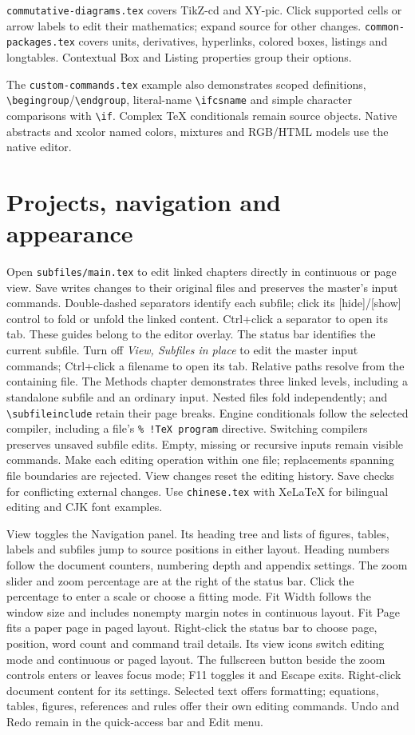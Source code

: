 \documentclass[11pt]{article}
\begin{document}
\texttt{commutative-diagrams.tex} covers TikZ-cd and XY-pic. Click supported cells
or arrow labels to edit their mathematics; expand source for other changes.
\texttt{common-packages.tex} covers units, derivatives, hyperlinks, colored boxes,
listings and longtables. Contextual Box and Listing properties group their options.

The \texttt{custom-commands.tex} example also demonstrates scoped definitions,
\verb|\begingroup|/\verb|\endgroup|, literal-name \verb|\ifcsname| and simple
character comparisons with \verb|\if|. Complex TeX conditionals remain source
objects. Native abstracts and xcolor named colors, mixtures and RGB/HTML models
use the native editor.

\section{Projects, navigation and appearance}
Open \texttt{subfiles/main.tex} to edit linked chapters directly in continuous
or page view. Save writes changes to their original files and preserves the
master's input commands. Double-dashed separators identify each subfile;
click its [hide]/[show] control to fold or unfold the linked content. Ctrl+click a separator to open its tab. These guides belong to the editor overlay. The status bar identifies the current subfile.
Turn off \emph{View, Subfiles in place} to edit the master input commands;
Ctrl+click a filename to open its tab. Relative paths resolve from the containing
file. The Methods chapter demonstrates three linked levels, including a
standalone subfile and an ordinary input. Nested files fold independently;
\verb|| and \verb|\subfileinclude| retain their page breaks.
Engine conditionals follow the selected compiler, including a file's
\verb|% !TeX program| directive. Switching compilers preserves unsaved subfile edits.
Empty, missing or recursive inputs remain visible commands. Make each editing operation within
one file; replacements spanning file boundaries are rejected. View changes
reset the editing history. Save checks for conflicting external changes.
Use \texttt{chinese.tex} with XeLaTeX for bilingual editing and CJK font examples.

View toggles the Navigation panel. Its heading tree and lists of figures,
tables, labels and subfiles jump to source positions in either layout. Heading
numbers follow the document counters, numbering depth and appendix settings. The zoom slider and
zoom percentage are at the right of the status bar. Click the percentage
to enter a scale or choose a fitting mode. Fit Width follows the
window size and includes nonempty margin notes in continuous layout. Fit Page
fits a paper page in paged layout. Right-click the status bar to choose page, position, word count and command
trail details. Its view icons switch editing mode and continuous or paged layout.
The fullscreen button beside the zoom controls enters or leaves focus mode;
F11 toggles it and Escape exits.
Right-click document content for its settings. Selected text offers formatting;
equations, tables, figures, references and rules offer their own editing commands.
Undo and Redo remain in the quick-access bar and Edit menu.
\end{document}
